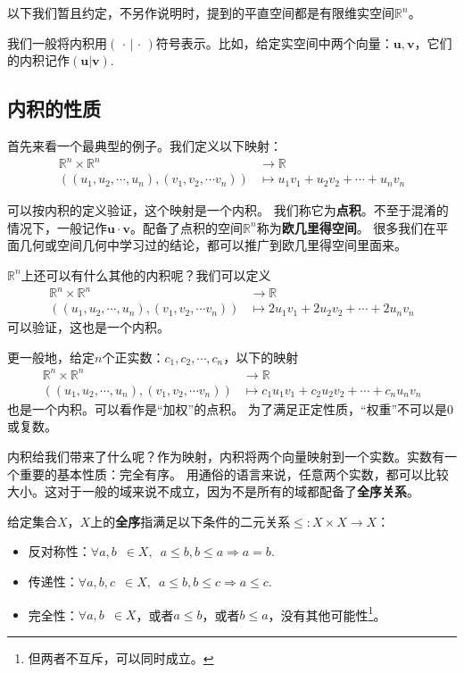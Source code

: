 \documentclass[12pt,UTF8]{ctexbook}
\begin{document}
以下我们暂且约定，不另作说明时，提到的平直空间都是有限维实空间$\mathbb{R}^n$。

我们一般将内积用$(\,\cdot \,|\, \cdot\,)$符号表示。比如，给定实空间中两个向量：$\mathbf{u}, \mathbf{v}$，它们的内积记作$(\mathbf{u} | \mathbf{v})$.

\subsection{内积的性质}
首先来看一个最典型的例子。我们定义以下映射：
\begin{align*}
    \mathbb{R}^n \times \mathbb{R}^n &\rightarrow \mathbb{R}  \\
   \left((u_1, u_2, \cdots, u_n) , (v_1, v_2, \cdots v_n)\right) &\mapsto u_1v_1 + u_2v_2 + \cdots + u_n v_n 
\end{align*}

可以按内积的定义验证，这个映射是一个内积。
我们称它为\textbf{点积}。不至于混淆的情况下，一般记作$\mathbf{u} \cdot \mathbf{v}$。配备了点积的空间$\mathbb{R}^n$称为\textbf{欧几里得空间}。
很多我们在平面几何或空间几何中学习过的结论，都可以推广到欧几里得空间里面来。

$\mathbb{R}^n$上还可以有什么其他的内积呢？我们可以定义
\begin{align*}
    \mathbb{R}^n \times \mathbb{R}^n &\rightarrow \mathbb{R}  \\
   \left((u_1, u_2, \cdots, u_n) , (v_1, v_2, \cdots v_n)\right) &\mapsto 2u_1v_1 + 2u_2v_2 + \cdots + 2u_n v_n 
\end{align*}
可以验证，这也是一个内积。

更一般地，给定$n$个正实数：$c_1, c_2, \cdots, c_n$，以下的映射
\begin{align*}
    \mathbb{R}^n \times \mathbb{R}^n &\rightarrow \mathbb{R}  \\
   \left((u_1, u_2, \cdots, u_n) , (v_1, v_2, \cdots v_n)\right) &\mapsto c_1u_1v_1 + c_2u_2v_2 + \cdots + c_nu_n v_n 
\end{align*}
也是一个内积。可以看作是“加权”的点积。
为了满足正定性质，“权重”不可以是0或复数。

内积给我们带来了什么呢？作为映射，内积将两个向量映射到一个实数。实数有一个重要的基本性质：完全有序。
用通俗的语言来说，任意两个实数，都可以比较大小。这对于一般的域来说不成立，因为不是所有的域都配备了\textbf{全序关系}。

\begin{df}\label{df:7_2}
    给定集合$X$，$X$上的\textbf{全序}指满足以下条件的二元关系$\leqslant :  X \times X \rightarrow X$：
    \begin{itemize}
        \item 反对称性：$ \forall a, b \,\,\, \in X, \,\,\, a \leqslant b, b\leqslant a \Rightarrow a = b.$
        \item 传递性：$ \forall a, b, c \,\,\, \in X, \,\,\, a \leqslant b, b\leqslant c \Rightarrow a \leqslant c.$
        \item 完全性：$ \forall a, b \,\,\, \in X$，或者$a \leqslant b$，或者$b\leqslant a$，没有其他可能性\footnote{但两者不互斥，可以同时成立。}。
    \end{itemize}
    
\end{df}
\end{document}
